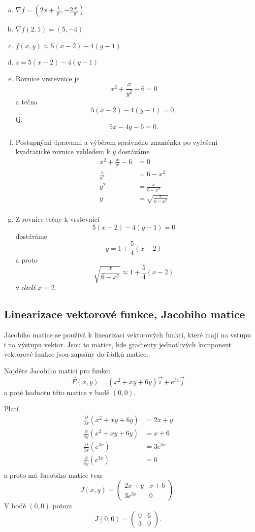 \reseni
\begin{enumerate}[a)]
\item $\nabla f=\left(2x+\frac 1{y^2},-2\frac x{y^3}\right)$
\item $\nabla f(2,1)=(5,-4)$
\item $f(x,y)\approx 5(x-2)-4(y-1)$
\item $z= 5(x-2)-4(y-1)$
\item Rovnice vrstevnice je $$x^2+\frac x{y^2}-6=0$$
  a tečna $$5(x-2)-4(y-1)=0,$$ tj. $$5x-4y-6=0.$$
\item Postupnými úpravami a výběrem správného znaménka po vyřešení kvadratické rovnice vzhledem k $y$ dostáváme
  $$
  \begin{aligned}
    x^2+\frac x{y^2}-6&=0\\
        \frac x{y^2}&=6-x^2\\
        y^2&=\frac{x}{6-x^2}\\
        y&=\sqrt{\frac{x}{6-x^2}}\\
  \end{aligned}
$$
\item Z rovnice tečny k vrstevnici $$5(x-2)-4(y-1)=0$$
  dostáváme $$y=1+\frac 54 (x-2)$$
  a proto
  $$\sqrt{\frac{x}{6-x^2}}\approx 1+\frac 54 (x-2)$$ v okolí $x=2$.
\end{enumerate}

\konec


\subsection{Linearizace vektorové funkce, Jacobiho matice}

Jacobiho matice se používá k linearizaci vektorových funkcí, které
mají na vstupu i na výstupu vektor. Jsou to matice, kde gradienty
jednotlivých komponent vektorové funkce jsou zapsány do řádků matice.

Najděte Jacobiho matici pro funkci $$\vec F(x,y)=(x^2+xy+6y)\vec i + e^{3x}\vec j$$ a poté hodnotu této matice v bodě $(0,0)$.

\reseni

Platí
\begin{align*}
  \frac{\partial }{\partial x}\left(x^2 +xy+6y\right) &=2x+y\\
  \frac{\partial }{\partial y}\left(x^2 +xy+6y\right) &=x+6\\
  \frac{\partial }{\partial x}\left(e^{3x}\right) &=3e^{3x}\\
  \frac{\partial }{\partial y}\left(e^{3x}\right) &=0\\
\end{align*}
a proto má Jacobiho matice tvar
\begin{equation*}
  J(x,y)=
  \begin{pmatrix}
    2x+y & x+6\\ 3e^{3x} & 0
  \end{pmatrix}.
\end{equation*}
V bodě $(0,0)$ potom 
\begin{equation*}
  J(0,0)=
  \begin{pmatrix}
    0 & 6\\ 3 & 0
  \end{pmatrix}.
\end{equation*}


